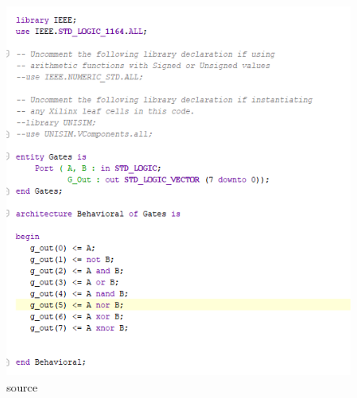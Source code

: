 \documentclass{article}
\begin{document}
\begin{figure}[h]
\begin{center}
\includegraphics[width=1\textwidth]{GatesSource.png} %
\caption{source}
\end{center}
\end{figure}
\end{document}
